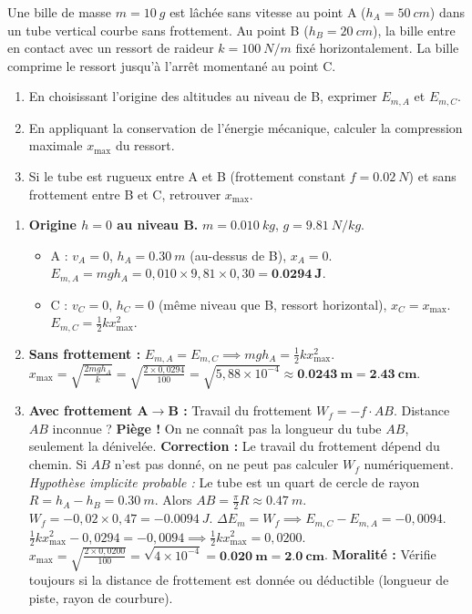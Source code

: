 \documentclass[11pt]{article}
\begin{document}
\begin{exercice}
Une bille de masse $m = \SI{10}{g}$ est lâchée sans vitesse au point A ($h_A = \SI{50}{cm}$) dans un tube vertical courbe sans frottement. Au point B ($h_B = \SI{20}{cm}$), la bille entre en contact avec un ressort de raideur $k = \SI{100}{N/m}$ fixé horizontalement. La bille comprime le ressort jusqu'à l'arrêt momentané au point C.
\begin{enumerate}
    \item En choisissant l'origine des altitudes au niveau de B, exprimer $E_{m,A}$ et $E_{m,C}$.
    \item En appliquant la conservation de l'énergie mécanique, calculer la compression maximale $x_{\text{max}}$ du ressort.
    \item Si le tube est rugueux entre A et B (frottement constant $f = \SI{0,02}{N}$) et sans frottement entre B et C, retrouver $x_{\text{max}}$.
\end{enumerate}
\end{exercice}

\begin{corrige}
\begin{enumerate}
    \item \textbf{Origine $h=0$ au niveau B.} $m=\SI{0,010}{kg}$, $g=\SI{9,81}{N/kg}$.
    \begin{itemize}
        \item A : $v_A=0$, $h_A = \SI{0,30}{m}$ (au-dessus de B), $x_A=0$. $E_{m,A} = mgh_A = 0,010 \times 9,81 \times 0,30 = \mathbf{\SI{0,0294}{J}}$.
        \item C : $v_C=0$, $h_C = 0$ (même niveau que B, ressort horizontal), $x_C = x_{\text{max}}$. $E_{m,C} = \frac{1}{2}k x_{\text{max}}^2$.
    \end{itemize}
    \item \textbf{Sans frottement :} $E_{m,A} = E_{m,C} \implies mgh_A = \frac{1}{2}k x_{\text{max}}^2$.
    $x_{\text{max}} = \sqrt{\frac{2mgh_A}{k}} = \sqrt{\frac{2 \times 0,0294}{100}} = \sqrt{5,88 \times 10^{-4}} \approx \mathbf{\SI{0,0243}{m} = \SI{2,43}{cm}}$.
    \item \textbf{Avec frottement A$\to$B :} Travail du frottement $W_f = -f \cdot AB$. Distance $AB$ inconnue ? \textbf{Piège !} On ne connaît pas la longueur du tube $AB$, seulement la dénivelée.
    \textbf{Correction :} Le travail du frottement dépend du chemin. Si $AB$ n'est pas donné, on ne peut pas calculer $W_f$ numériquement.
    \emph{Hypothèse implicite probable :} Le tube est un quart de cercle de rayon $R = h_A - h_B = \SI{0,30}{m}$. Alors $AB = \frac{\pi}{2}R \approx \SI{0,47}{m}$.
    $W_f = -0,02 \times 0,47 = -\SI{0,0094}{J}$.
    $\Delta E_m = W_f \implies E_{m,C} - E_{m,A} = -0,0094$.
    $\frac{1}{2}k x_{\text{max}}^2 - 0,0294 = -0,0094 \implies \frac{1}{2}k x_{\text{max}}^2 = 0,0200$.
    $x_{\text{max}} = \sqrt{\frac{2 \times 0,0200}{100}} = \sqrt{4 \times 10^{-4}} = \mathbf{\SI{0,020}{m} = \SI{2,0}{cm}}$.
    \textbf{Moralité :} Vérifie toujours si la distance de frottement est donnée ou déductible (longueur de piste, rayon de courbure).
\end{enumerate}
\end{corrige}
\end{document}

